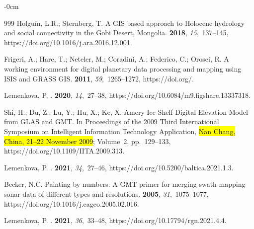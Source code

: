 \documentclass[geosciences,article,accept,pdftex,oneauthor]{Definitions/mdpi}
\begin{document}
\begin{adjustwidth}{-\extralength}{0cm}
\begin{thebibliography}{999}
Holguín, L.R.; Sternberg, T.
\newblock A GIS based approach to Holocene hydrology and social connectivity in
  the Gobi Desert, Mongolia.
 {\bf 2018}, {\em 15},~137--145, https://doi.org/10.1016/j.ara.2016.12.001.

Frigeri, A.; Hare, T.; Neteler, M.; Coradini, A.; Federico, C.; Orosei, R.
\newblock A working environment for digital planetary data processing and
  mapping using ISIS and GRASS GIS.
 {\bf 2011}, {\em 59},~1265--1272,
  https://doi.org/{\href{https://doi.org/10.1016/j.pss.2010.12.008}{}}.

Lemenkova, P.
.
 {\bf 2020}, {\em 14},~27--38, https://doi.org/10.6084/m9.figshare.13337318.

Shi, H.; Du, Z.; Lu, Y.; Hu, X.; Ke, X.
\newblock Amery Ice Shelf Digital Elevation Model from GLAS and GMT.
\newblock In Proceedings of the 2009 Third International Symposium on
  Intelligent Information Technology Application, \hl{Nan Chang, China,  21--22 November 2009}; Volume~2, pp.~129--133, https://doi.org/10.1109/IITA.2009.313.

Lemenkova, P.
.
 {\bf 2021}, {\em 34},~27--46, https://doi.org/10.5200/baltica.2021.1.3.

Becker, N.C.
\newblock Painting by numbers: A GMT primer for merging swath-mapping sonar
  data of different types and resolutions.
 {\bf 2005}, {\em 31},~1075--1077, https://doi.org/10.1016/j.cageo.2005.02.016.

Lemenkova, P.
.
 {\bf 2021}, {\em 36},~33--48, https://doi.org/10.17794/rgn.2021.4.4.


\end{thebibliography}
\end{adjustwidth}
\end{document}
